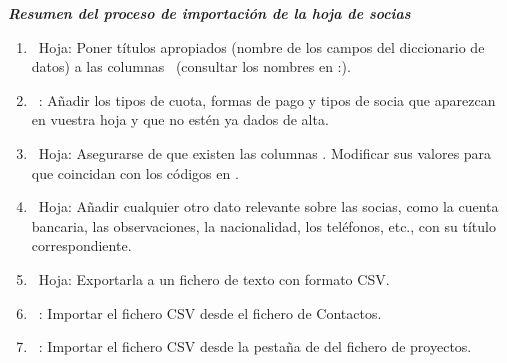 \begin{center}
\begin{minipage}{15.189cm}
{\centering\bfseries\itshape
Resumen del proceso de importación de la hoja de socias
\par}

\liststyleLvi
\begin{enumerate}
\item \ Hoja: Poner títulos apropiados (nombre de los campos del
diccionario de datos) a las columnas \ (consultar los nombres en
\appname:).
\item \ \appname: Añadir los tipos de cuota, formas de pago y tipos de
socia que aparezcan en vuestra hoja y que no estén ya dados de alta.
\item \ Hoja: Asegurarse de que existen las columnas
. Modificar sus valores para que coincidan con los
códigos en \appname.
\item \ Hoja: Añadir cualquier otro dato relevante sobre las socias,
como la cuenta bancaria, las observaciones, la nacionalidad, los
teléfonos, etc., con su título correspondiente.
\item \ Hoja: Exportarla a un fichero de texto con formato CSV.
\item \ \appname: Importar el fichero CSV desde el fichero de Contactos.
\item \ \appname: Importar el fichero CSV desde la pestaña de
 del fichero de
proyectos.
\end{enumerate}
\end{minipage}
\end{center}
